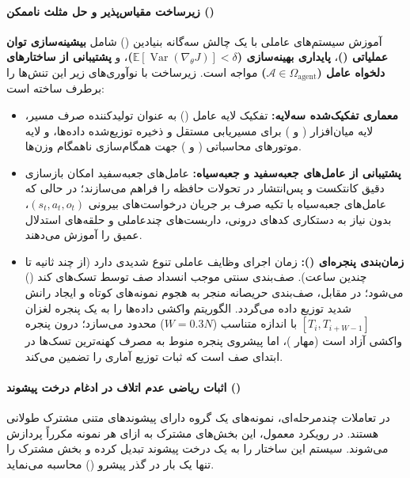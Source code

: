 \paragraph*{زیرساخت مقیاس‌پذیر  و حل مثلث ناممکن ()}
آموزش سیستم‌های عاملی با یک چالش سه‌گانه بنیادین () شامل \textbf{بیشینه‌سازی توان عملیاتی ()}، \textbf{پایداری بهینه‌سازی ($\mathbb{E}[\operatorname{Var}(\nabla_\theta J)] < \delta$)}، و \textbf{پشتیبانی از ساختارهای دلخواه عامل ($\mathcal{A} \in \Omega_{\text{agent}}$)} مواجه است. زیرساخت  با نوآوری‌های زیر این تنش‌ها را برطرف ساخته است:
\begin{itemize}
    \item \textbf{معماری تفکیک‌شده سه‌لایه:} تفکیک لایه عامل () به عنوان تولیدکننده صرف مسیر، لایه میان‌افزار ( و ) برای مسیریابی مستقل و ذخیره توزیع‌شده داده‌ها، و لایه موتورهای محاسباتی ( و ) جهت همگام‌سازی ناهمگام وزن‌ها.
    \item \textbf{پشتیبانی از عامل‌های جعبه‌سفید و جعبه‌سیاه:} عامل‌های جعبه‌سفید امکان بازسازی دقیق کانتکست و پس‌انتشار در تحولات حافظه را فراهم می‌سازند؛ در حالی که عامل‌های جعبه‌سیاه با تکیه صرف بر جریان درخواست‌های بیرونی $(s_t, a_t, o_t)$، بدون نیاز به دستکاری کدهای درونی، داربست‌های چندعاملی و حلقه‌های استدلال عمیق را آموزش می‌دهند.
    \item \textbf{زمان‌بندی پنجره‌ای ():} زمان اجرای وظایف عاملی تنوع شدیدی دارد (از چند ثانیه تا چندین ساعت). صف‌بندی سنتی  موجب انسداد صف توسط تسک‌های کند () می‌شود؛ در مقابل، صف‌بندی حریصانه منجر به هجوم نمونه‌های کوتاه و ایجاد رانش شدید توزیع داده می‌گردد. الگوریتم  واکشی داده‌ها را به یک پنجره لغزان $[T_i, T_{i+W-1}]$ با اندازه متناسب ($W = 0.3N$) محدود می‌سازد؛ درون پنجره واکشی آزاد است (مهار )، اما پیشروی پنجره منوط به مصرف کهنه‌ترین تسک‌ها در ابتدای صف است که ثبات توزیع آماری را تضمین می‌کند.
\end{itemize}

\paragraph*{اثبات ریاضی عدم اتلاف در ادغام درخت پیشوند ()}
در تعاملات چندمرحله‌ای، نمونه‌های یک گروه دارای پیشوندهای متنی مشترک طولانی هستند. در رویکرد معمول، این بخش‌های مشترک به ازای هر نمونه مکرراً پردازش می‌شوند. سیستم  این ساختار را به یک درخت پیشوند تبدیل کرده و بخش مشترک را تنها یک بار در گذر پیشرو () محاسبه می‌نماید.

